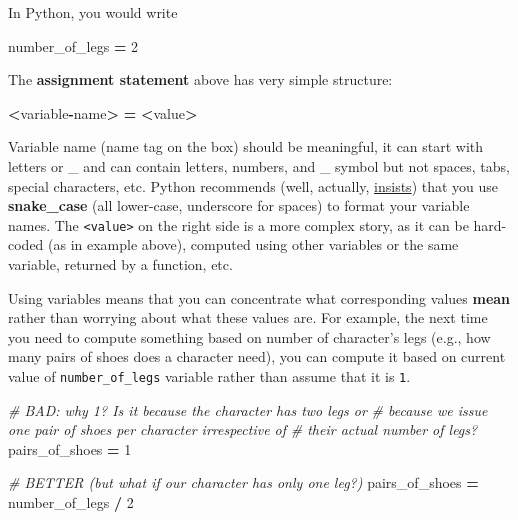 \documentclass[
]{book}
\newenvironment{Shaded}{\begin{snugshade}}{\end{snugshade}}
\newcommand{\CommentTok}[1]{\textcolor[rgb]{0.56,0.35,0.01}{\textit{#1}}}
\newcommand{\DecValTok}[1]{\textcolor[rgb]{0.00,0.00,0.81}{#1}}
\newcommand{\NormalTok}[1]{#1}
\newcommand{\OperatorTok}[1]{\textcolor[rgb]{0.81,0.36,0.00}{\textbf{#1}}}
\begin{document}
In Python, you would write

\begin{Shaded}
\begin{Highlighting}[]
\NormalTok{number\_of\_legs }\OperatorTok{=} \DecValTok{2}
\end{Highlighting}
\end{Shaded}

The \textbf{assignment statement} above has very simple structure:

\begin{Shaded}
\begin{Highlighting}[]
\OperatorTok{\textless{}}\NormalTok{variable}\OperatorTok{{-}}\NormalTok{name}\OperatorTok{\textgreater{}} \OperatorTok{=} \OperatorTok{\textless{}}\NormalTok{value}\OperatorTok{\textgreater{}}
\end{Highlighting}
\end{Shaded}

Variable name (name tag on the box) should be meaningful, it can start with letters or \_ and can contain letters, numbers, and \_ symbol but not spaces, tabs, special characters, etc. Python recommends (well, actually, \href{https://www.python.org/dev/peps/pep-0008/}{insists}) that you use \textbf{snake\_case} (all lower-case, underscore for spaces) to format your variable names. The \texttt{\textless{}value\textgreater{}} on the right side is a more complex story, as it can be hard-coded (as in example above), computed using other variables or the same variable, returned by a function, etc.

Using variables means that you can concentrate what corresponding values \textbf{mean} rather than worrying about what these values are. For example, the next time you need to compute something based on number of character's legs (e.g., how many pairs of shoes does a character need), you can compute it based on current value of \texttt{number\_of\_legs} variable rather than assume that it is \texttt{1}.

\begin{Shaded}
\begin{Highlighting}[]
\CommentTok{\# BAD: why 1? Is it because the character has two legs or}
\CommentTok{\# because we issue one pair of shoes per character irrespective of}
\CommentTok{\# their actual number of legs?}
\NormalTok{pairs\_of\_shoes }\OperatorTok{=} \DecValTok{1}

\CommentTok{\# BETTER (but what if our character has only one leg?)}
\NormalTok{pairs\_of\_shoes }\OperatorTok{=}\NormalTok{ number\_of\_legs }\OperatorTok{/} \DecValTok{2}
\end{Highlighting}
\end{Shaded}
\end{document}
